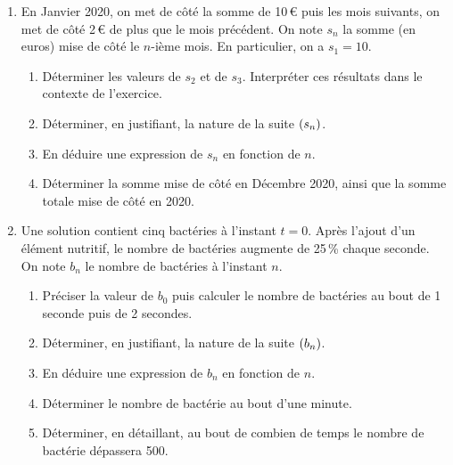 \documentclass[a4paper,11pt]{article}
\begin{document}
\pagebreak


\begin{enumerate}
	\item En Janvier 2020, on met de côté la somme de 10\,€ puis les mois suivants, on met de côté 2\,€ de plus que le mois précédent. On note $s_n$ la somme (en euros) mise de côté le $n$-ième mois. En particulier, on a $s_1=10$.
	\begin{enumerate}
		\item Déterminer les valeurs de $s_2$ et de $s_3$. Interpréter ces résultats dans le contexte de l'exercice.
		\item Déterminer, en justifiant, la nature de la suite $\suiten[s]$.
		\item En déduire une expression de $s_n$ en fonction de $n$.
		\item Déterminer la somme mise de côté en Décembre 2020, ainsi que la somme totale mise de côté en 2020.
	\end{enumerate}
	\item Une solution contient cinq bactéries à l'instant $t=0$. Après l'ajout d'un élément nutritif, le nombre de bactéries augmente de 25\,\% chaque seconde. On note $b_n$ le nombre de bactéries à l'instant $n$.
	\begin{enumerate}
		\item Préciser la valeur de $b_0$ puis calculer le nombre de bactéries au bout de 1 seconde puis de 2 secondes.
		\item Déterminer, en justifiant, la nature de la suite $\suiten[b]$.
		\item En déduire une expression de $b_n$ en fonction de $n$.
		\item Déterminer le nombre de bactérie au bout d'une minute.
		\item Déterminer, en détaillant, au bout de combien de temps le nombre de bactérie dépassera 500.
	\end{enumerate}
\end{enumerate}

\smallskip


\medskip
\end{document}
